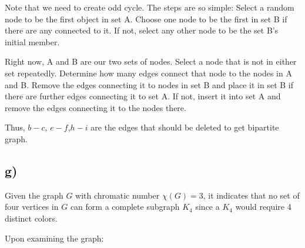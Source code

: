 \documentclass[12pt]{article}
\begin{document}
Note that we need to create odd cycle.
The steps are so simple:
Select a random node to be the first object in set A. Choose one node to be the first in set B if there are any connected to it. If not, select any other node to be the set B's initial member.

Right now, A and B are our two sets of nodes. Select a node that is not in either set repeatedly. Determine how many edges connect that node to the nodes in A and B. Remove the edges connecting it to nodes in set B and place it in set B if there are further edges connecting it to set A. If not, insert it into set A and remove the edges connecting it to the nodes there.

Thus, \( b-c \), \( e-f \),\( h-i \) are the edges that should be deleted to get bipartite graph.


\subsection*{g)}

Given the graph \( G \) with chromatic number \( \chi(G) = 3 \), it indicates that no set of four vertices in \( G \) can form a complete subgraph \( K_4 \) since a \( K_4 \) would require 4 distinct colors.

Upon examining the graph:
\end{document}
